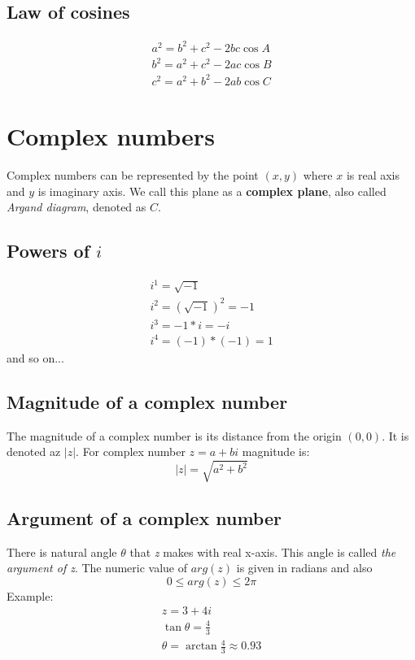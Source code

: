 \documentclass{article}
\begin{document}
\subsection{Law of cosines}
\begin{equation}
  \begin{gathered}
    a^2 = b^2 + c^2 - 2bc\cos{A} \\
    b^2 = a^2 + c^2 - 2ac\cos{B} \\
    c^2 = a^2 + b^2 - 2ab\cos{C}
  \end{gathered}
\end{equation}

\section{Complex numbers}
Complex numbers can be represented by the point $(x, y)$ where $x$ is real axis and $y$
is imaginary axis. We call this plane as a \textbf{complex plane}, also called
\textit{Argand diagram}, denoted as $C$.

\subsection{Powers of $i$}
\begin{equation}
  \begin{gathered}
    i^1 = \sqrt{-1} \\
    i^2 = (\sqrt{-1})^2 = -1 \\
    i^3 = -1 * i = -i \\
    i^4 = (-1) * (-1) = 1
  \end{gathered}
\end{equation}
and so on...

\subsection{Magnitude of a complex number}
The magnitude of a complex number is its distance from the origin $(0, 0)$.
It is denoted az $|z|$. For complex number $z = a + bi$ magnitude is:
\begin{equation}
  |z| = \sqrt{a^2 + b^2}
\end{equation}

\subsection{Argument of a complex number}
There is natural angle $\theta$ that \textit{z} makes with real x-axis. This angle is called \textit{the argument of z}. The numeric value of $arg(z)$ is given in radians and also
\begin{equation}
  0 \leq arg(z) \leq 2\pi
\end{equation}
Example:
\begin{equation}
  \begin{gathered}
    z = 3 + 4i \\
    \tan \theta = \frac{4}{3} \\
    \theta = \arctan\frac{4}{3} \approx 0.93
  \end{gathered}
\end{equation}
\end{document}
